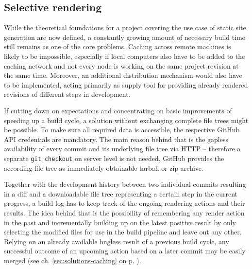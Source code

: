 \subsection{Selective rendering}
\label{sec:primarythoughts-rendering}

While the theoretical foundations for a project covering the use case of static site generation are now defined, a constantly growing amount of necessary build time still remains as one of the core problems. Caching across remote machines is likely to be impossible, especially if local computers also have to be added to the caching network and not every node is working on the same project revision at the same time. Moreover, an additional distribution mechanism would also have to be implemented, acting primarily as supply tool for providing already rendered revisions of different steps in development.

If cutting down on expectations and concentrating on basic improvements of speeding up a build cycle, a solution without exchanging complete file trees might be possible. To make sure all required data is accessible, the respective GitHub API credentials are mandatory. The main reason behind that is the gapless availability of every commit and its underlying file tree via HTTP -- therefore a separate \texttt{git checkout} on server level is not needed, GitHub provides the according file tree as immediately obtainable tarball or zip archive.

Together with the development history between two individual commits resulting in a diff and a downloadable file tree representing a certain step in the current progress, a build log has to keep track of the ongoing rendering actions and their results. The idea behind that is the possibility of remembering any render action in the past and incrementally building up on the latest positive result by only selecting the modified files for use in the build pipeline and leave out any other. Relying on an already available bugless result of a previous build cycle, any successful outcome of an upcoming action based on a later commit may be easily merged (see ch. \ref{sec:solutions-caching} on p. \pageref{sec:solutions-caching}).
